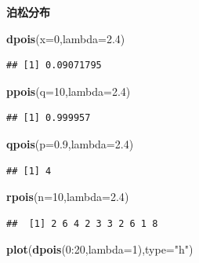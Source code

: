 \documentclass[]{article}
\newenvironment{Shaded}{\begin{snugshade}}{\end{snugshade}}
\newcommand{\KeywordTok}[1]{\textcolor[rgb]{0.13,0.29,0.53}{\textbf{{#1}}}}
\newcommand{\DataTypeTok}[1]{\textcolor[rgb]{0.13,0.29,0.53}{{#1}}}
\newcommand{\DecValTok}[1]{\textcolor[rgb]{0.00,0.00,0.81}{{#1}}}
\newcommand{\FloatTok}[1]{\textcolor[rgb]{0.00,0.00,0.81}{{#1}}}
\newcommand{\StringTok}[1]{\textcolor[rgb]{0.31,0.60,0.02}{{#1}}}
\newcommand{\NormalTok}[1]{{#1}}
\begin{document}
\textbf{泊松分布}

\begin{Shaded}
\begin{Highlighting}[]
\KeywordTok{dpois}\NormalTok{(}\DataTypeTok{x=}\DecValTok{0}\NormalTok{,}\DataTypeTok{lambda=}\FloatTok{2.4}\NormalTok{)}
\end{Highlighting}
\end{Shaded}

\begin{verbatim}
## [1] 0.09071795
\end{verbatim}

\begin{Shaded}
\begin{Highlighting}[]
\KeywordTok{ppois}\NormalTok{(}\DataTypeTok{q=}\DecValTok{10}\NormalTok{,}\DataTypeTok{lambda=}\FloatTok{2.4}\NormalTok{)}
\end{Highlighting}
\end{Shaded}

\begin{verbatim}
## [1] 0.999957
\end{verbatim}

\begin{Shaded}
\begin{Highlighting}[]
\KeywordTok{qpois}\NormalTok{(}\DataTypeTok{p=}\FloatTok{0.9}\NormalTok{,}\DataTypeTok{lambda=}\FloatTok{2.4}\NormalTok{)}
\end{Highlighting}
\end{Shaded}

\begin{verbatim}
## [1] 4
\end{verbatim}

\begin{Shaded}
\begin{Highlighting}[]
\KeywordTok{rpois}\NormalTok{(}\DataTypeTok{n=}\DecValTok{10}\NormalTok{,}\DataTypeTok{lambda=}\FloatTok{2.4}\NormalTok{)}
\end{Highlighting}
\end{Shaded}

\begin{verbatim}
##  [1] 2 6 4 2 3 3 2 6 1 8
\end{verbatim}

\begin{Shaded}
\begin{Highlighting}[]
\KeywordTok{plot}\NormalTok{(}\KeywordTok{dpois}\NormalTok{(}\DecValTok{0}\NormalTok{:}\DecValTok{20}\NormalTok{,}\DataTypeTok{lambda=}\DecValTok{1}\NormalTok{),}\DataTypeTok{type=}\StringTok{"h"}\NormalTok{)}
\end{Highlighting}
\end{Shaded}
\end{document}
